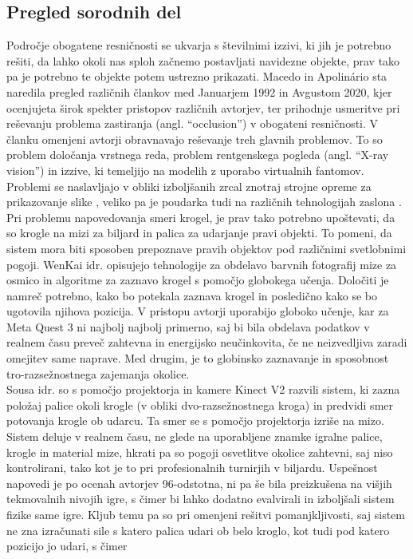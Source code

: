 \documentclass[a4paper, 12pt]{article}
\begin{document}
\subsection{Pregled sorodnih del}
Področje obogatene resničnosti se ukvarja s številnimi izzivi, ki jih je potrebno rešiti, da lahko okoli nas sploh začnemo postavljati navidezne objekte, prav tako pa je potrebno te objekte potem ustrezno prikazati.
Macedo in Apolinário \cite{Macedo2023Occlusion} sta naredila pregled različnih člankov med Januarjem 1992 in Avgustom 2020,  kjer  ocenjujeta širok spekter pristopov različnih avtorjev, ter prihodnje usmeritve pri reševanju problema zastiranja (angl. ``occlusion'') v obogateni resničnosti. V članku omenjeni avtorji \cite{Krajancich2020Factored} obravnavajo reševanje 
treh glavnih problemov. To so problem določanja vrstnega reda, problem rentgenskega pogleda (angl. ``X-ray vision'') in izzive, ki temeljijo na modelih z uporabo virtualnih fantomov. Problemi se naslavljajo v obliki izboljšanih zrcal znotraj strojne opreme za prikazovanje slike \cite{Krajancich2020Factored}, veliko pa je poudarka tudi na različnih tehnologijah zaslona \cite{Zhang2023AddOn}.\\
Pri problemu napovedovanja smeri krogel, je prav tako potrebno upoštevati, da so krogle na mizi za biljard in palica za udarjanje pravi objekti. To pomeni, da sistem mora biti sposoben prepoznave pravih objektov pod različnimi svetlobnimi pogoji. WenKai idr. \cite{WenKai2024} opisujejo tehnologije za
obdelavo barvnih fotografij mize za osmico in algoritme za zaznavo krogel s pomočjo globokega učenja. Določiti je namreč potrebno, kako bo potekala zaznava krogel in posledično kako se bo ugotovila njihova pozicija. V pristopu avtorji uporabijo globoko učenje, kar za Meta
Quest 3 ni najbolj najbolj primerno, saj bi bila obdelava podatkov v realnem času preveč zahtevna in energijsko neučinkovita, če ne neizvedljiva zaradi omejitev same naprave.
Med drugim, je to globinsko zaznavanje in sposobnost tro-razsežnostnega zajemanja okolice. \\
Sousa idr. \cite{Sousa2016} so s pomočjo projektorja in kamere Kinect V2 razvili sistem,
ki zazna položaj palice okoli krogle (v obliki dvo-razsežnostnega kroga) in predvidi smer potovanja krogle ob udarcu. Ta smer se s pomočjo projektorja izriše na mizo. Sistem deluje v realnem času, ne glede na uporabljene znamke igralne palice,
krogle in material mize, hkrati pa so pogoji osvetlitve okolice zahtevni, saj niso kontrolirani, tako kot je
to pri profesionalnih turnirjih v biljardu. Uspešnost napovedi je po ocenah avtorjev 96-odstotna, ni pa še bila preizkušena na višjih tekmovalnih nivojih igre, s čimer bi lahko dodatno evalvirali in izboljšali sistem fizike same igre. Kljub temu pa so pri omenjeni rešitvi pomanjkljivosti, saj sistem ne zna izračunati sile s katero palica udari ob belo kroglo, kot tudi pod katero pozicijo jo udari, s čimer
\end{document}
